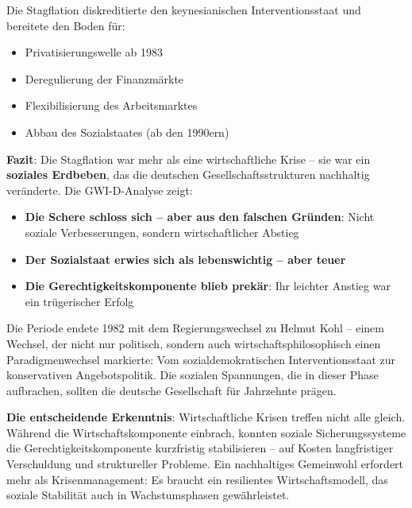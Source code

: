 Die Stagflation diskreditierte den keynesianischen Interventionsstaat und bereitete den Boden für:
\begin{itemize}
    \item Privatisierungswelle ab 1983
    \item Deregulierung der Finanzmärkte
    \item Flexibilisierung des Arbeitsmarktes
    \item Abbau des Sozialstaates (ab den 1990ern)
\end{itemize}

\textbf{Fazit}: Die Stagflation war mehr als eine wirtschaftliche Krise – sie war ein \textbf{soziales Erdbeben}, das die deutschen Gesellschaftsstrukturen nachhaltig veränderte. Die GWI-D-Analyse zeigt:

\begin{itemize}
    \item \textbf{Die Schere schloss sich – aber aus den falschen Gründen}: Nicht soziale Verbesserungen, sondern wirtschaftlicher Abstieg
    \item \textbf{Der Sozialstaat erwies sich als lebenswichtig – aber teuer}
    \item \textbf{Die Gerechtigkeitskomponente blieb prekär}: Ihr leichter Anstieg war ein trügerischer Erfolg
\end{itemize}

Die Periode endete 1982 mit dem Regierungswechsel zu Helmut Kohl – einem Wechsel, der nicht nur politisch, sondern auch wirtschaftsphilosophisch einen Paradigmenwechsel markierte: Vom sozialdemokratischen Interventionsstaat zur konservativen Angebotspolitik. Die sozialen Spannungen, die in dieser Phase aufbrachen, sollten die deutsche Gesellschaft für Jahrzehnte prägen.

\textbf{Die entscheidende Erkenntnis}: Wirtschaftliche Krisen treffen nicht alle gleich. Während die Wirtschaftskomponente einbrach, konnten soziale Sicherungssysteme die Gerechtigkeitskomponente kurzfristig stabilisieren – auf Kosten langfristiger Verschuldung und struktureller Probleme. Ein nachhaltiges Gemeinwohl erfordert mehr als Krisenmanagement: Es braucht ein resilientes Wirtschaftsmodell, das soziale Stabilität auch in Wachstumsphasen gewährleistet.

\endinput